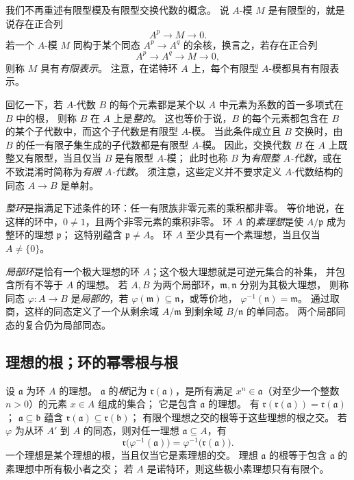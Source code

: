 我们不再重述有限型模及有限型交换代数的概念。
说 $A$-模 $M$ 是有限型的，就是说存在正合列
\[
 A^p\longrightarrow M\longrightarrow0.
\]
若一个 $A$-模 $M$ 同构于某个同态 $A^p\to A^q$ 的余核，换言之，若存在正合列
\[
 A^p\longrightarrow A^q\longrightarrow M\longrightarrow0,
\]
则称 $M$ 具有\emph{有限表示}。
注意，在诺特环 $A$ 上，每个有限型 $A$-模都具有有限表示。

回忆一下，若 $A$-代数 $B$ 的每个元素都是某个以 $A$ 中元素为系数的首一多项式在 $B$ 中的根，
则称 $B$ 在 $A$ 上是\emph{整的}。
这也等价于说，$B$ 的每个元素都包含在 $B$ 的某个子代数中，而这个子代数是有限型 $A$-模。
当此条件成立且 $B$ 交换时，由 $B$ 的任一有限子集生成的子代数都是有限型 $A$-模。
因此，交换代数 $B$ 在 $A$ 上既整又有限型，当且仅当 $B$ 是有限型 $A$-模；
此时也称 $B$ 为\emph{有限整 $A$-代数}，或在不致混淆时简称为\emph{有限 $A$-代数}。
须注意，这些定义并不要求定义 $A$-代数结构的同态 $A\to B$ 是单射。

\emph{整环}是指满足下述条件的环：任一有限族非零元素的乘积都非零。
等价地说，在这样的环中，$0\ne1$，且两个非零元素的乘积非零。
环 $A$ 的\emph{素理想}是使 $A/\mathfrak p$ 成为整环的理想 $\mathfrak p$；
这特别蕴含 $\mathfrak p\ne A$。
环 $A$ 至少具有一个素理想，当且仅当 $A\ne\{0\}$。

\emph{局部环}是恰有一个极大理想的环 $A$；这个极大理想就是可逆元集合的补集，
并包含所有不等于 $A$ 的理想。
若 $A,B$ 为两个局部环，$\mathfrak m,\mathfrak n$ 分别为其极大理想，
则称同态 $\varphi\colon A\to B$ 是\emph{局部的}，若
$\varphi(\mathfrak m)\subseteq\mathfrak n$，或等价地，
$\varphi^{-1}(\mathfrak n)=\mathfrak m$。
通过取商，这样的同态定义了一个从剩余域 $A/\mathfrak m$ 到剩余域 $B/\mathfrak n$ 的单同态。
两个局部同态的复合仍为局部同态。

\subsection{理想的根；环的幂零根与根}\hypertarget{heading:0:1.1}{}

设 $\mathfrak a$ 为环 $A$ 的理想。
$\mathfrak a$ 的\emph{根}记为 $\mathfrak r(\mathfrak a)$，是所有满足
$x^n\in\mathfrak a$（对至少一个整数 $n>0$）的元素 $x\in A$ 组成的集合；
它是包含 $\mathfrak a$ 的理想。
有 $\mathfrak r(\mathfrak r(\mathfrak a))=\mathfrak r(\mathfrak a)$；
$\mathfrak a\subseteq\mathfrak b$ 蕴含
$\mathfrak r(\mathfrak a)\subseteq\mathfrak r(\mathfrak b)$；
有限个理想之交的根等于这些理想的根之交。
若 $\varphi$ 为从环 $A'$ 到 $A$ 的同态，则对任一理想 $\mathfrak a\subseteq A$，有
\[
 \mathfrak r\bigl(\varphi^{-1}(\mathfrak a)\bigr)
 =\varphi^{-1}\bigl(\mathfrak r(\mathfrak a)\bigr).
\]
一个理想是某个理想的根，当且仅当它是素理想的交。
理想 $\mathfrak a$ 的根等于包含 $\mathfrak a$ 的素理想中所有极小者之交；
若 $A$ 是诺特环，则这些极小素理想只有有限个。

